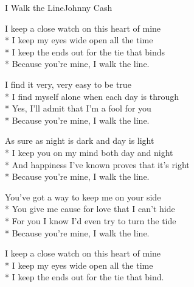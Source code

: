 \documentclass[10.5pt]{book}
\begin{document}
\begin{poem}{I Walk the Line}{Johnny Cash}

\settowidth{\versewidth}{And happiness I've known proves that it's right}

I keep a close watch on this heart of mine\\*
I keep my eyes wide open all the time\\*
I keep the ends out for the tie that binds\\*
Because you're mine, I walk the line.

I find it very, very easy to be true\\*
I find myself alone when each day is through\\*
Yes, I'll admit that I'm a fool for you\\*
Because you're mine, I walk the line.

As sure as night is dark and day is light\\*
I keep you on my mind both day and night\\*
And happiness I've known proves that it's right\\*
Because you're mine, I walk the line.

You've got a way to keep me on your side\\*
You give me cause for love that I can't hide\\*
For you I know I'd even try to turn the tide\\*
Because you're mine, I walk the line.

I keep a close watch on this heart of mine\\*
I keep my eyes wide open all the time\\*
I keep the ends out for the tie that bind.

\end{poem}
\iffalse
\end{document}
